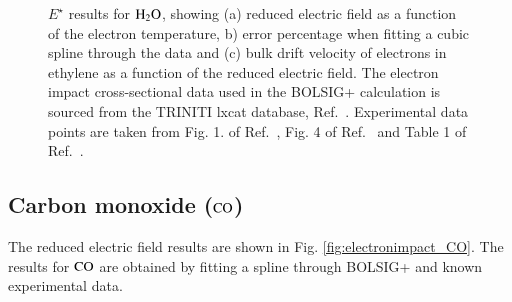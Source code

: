 \begin{figure}[!htbp]
\caption{$E^\star$ results for $\rm H_2O$, showing (a) reduced electric field as a function of the electron temperature, b) error percentage when fitting a cubic spline through the data and (c) bulk drift velocity of electrons in ethylene as a function of the reduced electric field. The electron impact cross-sectional data used in the BOLSIG+ calculation is sourced from the TRINITI lxcat database, Ref.\ \cite{phig:1987:yousfi}. Experimental data points are taken from Fig. 1. of Ref.\ \cite{jop:2007:hasegawa}, Fig. 4 of Ref.\ \cite{pra:1988:ness} and Table 1 of Ref.\ \cite{ajp:1990:cheung}.}
\label{fig:electronimpact_H2O}
\end{figure}
%

\subsection{Carbon monoxide ($\rm CO$)}

The reduced electric field results are shown in Fig. \ref{fig:electronimpact_CO}. The results for $\rm CO$ are obtained by fitting a spline through BOLSIG+ and known experimental data.

